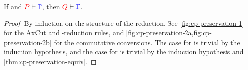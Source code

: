 \begin{theorem}[Preservation]\label{thm:cp-preservation}
  If  and $\seq[{ P }]{ \Gamma }$, then $\seq[{ Q }]{ \Gamma }$.
\end{theorem}
\begin{proof}
  By induction on the structure of the reduction. See
  \cref{fig:cp-preservation-1} for the AxCut and \textbeta-reduction rules, and
  \cref{fig:cp-preservation-2a,fig:cp-preservation-2b} for the commutative
  conversions. 
  The case for \cpRedGammaCut is trivial by the induction hypothesis, and the
  case for \cpRedGammaEquiv is trivial by the induction hypothesis and
  \cref{thm:cp-preservation-equiv}.
\end{proof}
